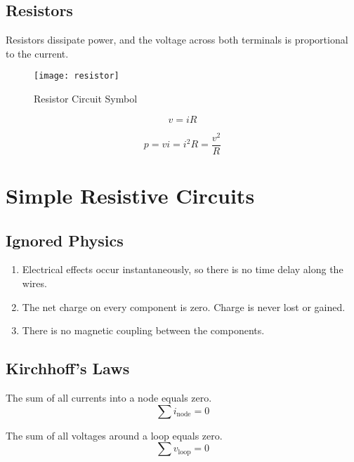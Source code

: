 \documentclass{article}
\begin{document}
\subsection{Resistors}
\begin{definition}[Resistor]
    Resistors dissipate power, and the voltage across both terminals is proportional to the current.
\end{definition}
\begin{figure}[H]
    \centering
    \texttt{[image: resistor]}
    \caption{Resistor Circuit Symbol}
\end{figure}
\begin{theorem}
    \begin{equation*}
        v=iR
    \end{equation*}
\end{theorem}
\begin{corollary}
    \begin{equation*}
        p = vi = i^2 R = \frac{v^2}{R}
    \end{equation*}
\end{corollary}
\newpage
\section{Simple Resistive Circuits}
\subsection{Ignored Physics}
\begin{enumerate}
    \item Electrical effects occur instantaneously, so there is no time delay along the wires.
    \item The net charge on every component is zero. Charge is never lost or gained.
    \item There is no magnetic coupling between the components.
\end{enumerate}
\subsection{Kirchhoff's Laws}
\begin{definition}
    The sum of all currents into a node equals zero.
    \begin{equation*}
        \sum i_{\mathrm{node}} = 0
    \end{equation*}
\end{definition}
\begin{definition}
    The sum of all voltages around a loop equals zero.
    \begin{equation*}
        \sum v_{\mathrm{loop}} = 0
    \end{equation*}
\end{definition}
\end{document}
